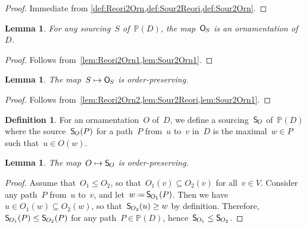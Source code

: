 \documentclass{amsart}
\newtheorem{lemma}[theorem]{Lemma}
\theoremstyle{definition}
\newtheorem{definition}[theorem]{Definition}
\newcommand{\eqdef}{\mbox{\,\raisebox{0.2ex}{\scriptsize\ensuremath{\mathrm:}}\ensuremath{=}\,}} %
\newcommand{\vincent}[1]{\todo[size=\tiny,color=blue!30]{ #1 \\ \hfill --- V.}\,}
\newcommand{\mymap}[2]{\mathsf{#1}_{\hspace{-.7pt}#2}}
\newcommand{\orn}[1]{\mymap{O}{#1}}  %
\DeclareMathOperator{\rev}{rev} %
\newcommand{\sour}[1]{\mymap{S}{#1}}  %
\newcommand{\PP}{\mathbb P} %
\begin{document}
\begin{proof}
Immediate from \cref{def:Reori2Orn,def:Sour2Reori,def:Sour2Orn}.
\end{proof}

\begin{lemma}
\label{lem:Sour2Orn2}
For any sourcing~$S$ of~$\PP(D)$, the map~$\orn{S}$ is an ornamentation of~$D$.
\end{lemma}

\begin{proof}
Follows from~\cref{lem:Reori2Orn1,lem:Sour2Orn1}.
\end{proof}

\begin{lemma}
\label{lem:Sour2Orn3}
The map~$S \mapsto \orn{S}$ is order-preserving.
\end{lemma}

\begin{proof}
Follows from~\cref{lem:Reori2Orn2,lem:Sour2Reori,lem:Sour2Orn1}.
\end{proof}

\begin{definition}
\label{def:Orn2Sour}
For an ornamentation~$O$ of~$D$, we define a sourcing~$\sour{O}$ of~$\PP(D)$ where the source~$\sour{O}(P)$ for a path~$P$ from~$u$ to~$v$ in~$D$ is the maximal~$w \in P$ such that~$u \in O(w)$.
\end{definition}

\begin{lemma}
\label{lem:Orn2Sour1}
The map~$O \mapsto \sour{O}$ is order-preserving.
\end{lemma}

\begin{proof}
Assume that~$O_1 \le O_2$, so that~$O_1(v) \subseteq O_2(v)$ for all~$v \in V$.
Consider any path~$P$ from~$u$ to~$v$, and let~$w \eqdef \sour{O_1}(P)$.
Then we have~$u \in O_1(w) \subseteq O_2(w)$, so that~$\sour{O_2}(u) \ge w$ by definition.
Therefore, $\sour{O_1}(P) \le \sour{O_2}(P)$ for any path~$P \in \PP(D)$, hence~${\sour{O_1} \le \sour{O_2}}$.
\end{proof}
\end{document}
